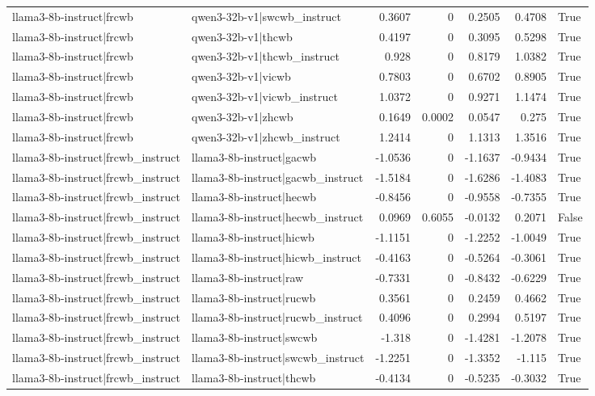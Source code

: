 \begin{table}
\begin{tabular}{l l r r r r l}
llama3-8b-instruct|frcwb & qwen3-32b-v1|swcwb_instruct & 0.3607 & 0 & 0.2505 & 0.4708 & True \\
llama3-8b-instruct|frcwb & qwen3-32b-v1|thcwb & 0.4197 & 0 & 0.3095 & 0.5298 & True \\
llama3-8b-instruct|frcwb & qwen3-32b-v1|thcwb_instruct & 0.928 & 0 & 0.8179 & 1.0382 & True \\
llama3-8b-instruct|frcwb & qwen3-32b-v1|vicwb & 0.7803 & 0 & 0.6702 & 0.8905 & True \\
llama3-8b-instruct|frcwb & qwen3-32b-v1|vicwb_instruct & 1.0372 & 0 & 0.9271 & 1.1474 & True \\
llama3-8b-instruct|frcwb & qwen3-32b-v1|zhcwb & 0.1649 & 0.0002 & 0.0547 & 0.275 & True \\
llama3-8b-instruct|frcwb & qwen3-32b-v1|zhcwb_instruct & 1.2414 & 0 & 1.1313 & 1.3516 & True \\
llama3-8b-instruct|frcwb_instruct & llama3-8b-instruct|gacwb & -1.0536 & 0 & -1.1637 & -0.9434 & True \\
llama3-8b-instruct|frcwb_instruct & llama3-8b-instruct|gacwb_instruct & -1.5184 & 0 & -1.6286 & -1.4083 & True \\
llama3-8b-instruct|frcwb_instruct & llama3-8b-instruct|hecwb & -0.8456 & 0 & -0.9558 & -0.7355 & True \\
llama3-8b-instruct|frcwb_instruct & llama3-8b-instruct|hecwb_instruct & 0.0969 & 0.6055 & -0.0132 & 0.2071 & False \\
llama3-8b-instruct|frcwb_instruct & llama3-8b-instruct|hicwb & -1.1151 & 0 & -1.2252 & -1.0049 & True \\
llama3-8b-instruct|frcwb_instruct & llama3-8b-instruct|hicwb_instruct & -0.4163 & 0 & -0.5264 & -0.3061 & True \\
llama3-8b-instruct|frcwb_instruct & llama3-8b-instruct|raw & -0.7331 & 0 & -0.8432 & -0.6229 & True \\
llama3-8b-instruct|frcwb_instruct & llama3-8b-instruct|rucwb & 0.3561 & 0 & 0.2459 & 0.4662 & True \\
llama3-8b-instruct|frcwb_instruct & llama3-8b-instruct|rucwb_instruct & 0.4096 & 0 & 0.2994 & 0.5197 & True \\
llama3-8b-instruct|frcwb_instruct & llama3-8b-instruct|swcwb & -1.318 & 0 & -1.4281 & -1.2078 & True \\
llama3-8b-instruct|frcwb_instruct & llama3-8b-instruct|swcwb_instruct & -1.2251 & 0 & -1.3352 & -1.115 & True \\
llama3-8b-instruct|frcwb_instruct & llama3-8b-instruct|thcwb & -0.4134 & 0 & -0.5235 & -0.3032 & True \\

\end{tabular}
\end{table}
